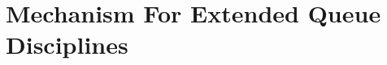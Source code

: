 \chapter{Mechanism For Extended Queue Disciplines}
\label{chapter:mechanism-for-extended-queue-disciplines}


